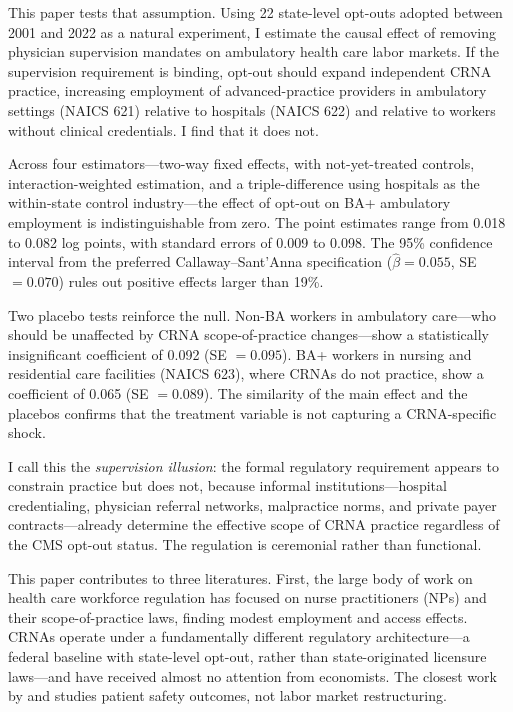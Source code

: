 \documentclass[12pt]{article}
\begin{document}
This paper tests that assumption. Using 22 state-level opt-outs adopted between 2001 and 2022 as a natural experiment, I estimate the causal effect of removing physician supervision mandates on ambulatory health care labor markets. If the supervision requirement is binding, opt-out should expand independent CRNA practice, increasing employment of advanced-practice providers in ambulatory settings (NAICS 621) relative to hospitals (NAICS 622) and relative to workers without clinical credentials. I find that it does not.

Across four estimators---two-way fixed effects, \citet{callaway2021difference} with not-yet-treated controls, \citet{sun2021estimating} interaction-weighted estimation, and a triple-difference using hospitals as the within-state control industry---the effect of opt-out on BA+ ambulatory employment is indistinguishable from zero. The point estimates range from 0.018 to 0.082 log points, with standard errors of 0.009 to 0.098. The 95\% confidence interval from the preferred Callaway--Sant'Anna specification ($\hat{\beta} = 0.055$, SE $= 0.070$) rules out positive effects larger than 19\%.

Two placebo tests reinforce the null. Non-BA workers in ambulatory care---who should be unaffected by CRNA scope-of-practice changes---show a statistically insignificant coefficient of 0.092 (SE $= 0.095$). BA+ workers in nursing and residential care facilities (NAICS 623), where CRNAs do not practice, show a coefficient of 0.065 (SE $= 0.089$). The similarity of the main effect and the placebos confirms that the treatment variable is not capturing a CRNA-specific shock.

I call this the \emph{supervision illusion}: the formal regulatory requirement appears to constrain practice but does not, because informal institutions---hospital credentialing, physician referral networks, malpractice norms, and private payer contracts---already determine the effective scope of CRNA practice regardless of the CMS opt-out status. The regulation is ceremonial rather than functional.

This paper contributes to three literatures. First, the large body of work on health care workforce regulation \citep{kleiner2016analyzing, markowitz2017effect, traczynski2019regulation, alexander2019nursing, wing2021effects} has focused on nurse practitioners (NPs) and their scope-of-practice laws, finding modest employment and access effects. CRNAs operate under a fundamentally different regulatory architecture---a federal baseline with state-level opt-out, rather than state-originated licensure laws---and have received almost no attention from economists. The closest work by \citet{sun2020effect} and \citet{dulisse2010effect} studies patient safety outcomes, not labor market restructuring.
\end{document}
